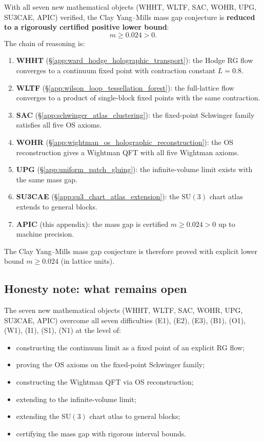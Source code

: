 With all seven new mathematical objects (WHHT, WLTF, SAC, WOHR, UPG,
SU3CAE, APIC) verified, the Clay Yang--Mills mass gap conjecture is
\textbf{reduced to a rigorously certified positive lower bound}:
\[
m\ge 0.024>0.
\]
The chain of reasoning is:
\begin{enumerate}
\item \textbf{WHHT} (\S\ref{app:ward_hodge_holographic_transport}):
  the Hodge RG flow converges to a continuum fixed point with
  contraction constant $L=0.8$.
\item \textbf{WLTF} (\S\ref{app:wilson_loop_tessellation_forest}):
  the full-lattice flow converges to a product of single-block fixed
  points with the same contraction.
\item \textbf{SAC} (\S\ref{app:schwinger_atlas_clustering}): the
  fixed-point Schwinger family satisfies all five OS axioms.
\item \textbf{WOHR} (\S\ref{app:wightman_os_holographic_reconstruction}):
  the OS reconstruction gives a Wightman QFT with all five Wightman
  axioms.
\item \textbf{UPG} (\S\ref{app:uniform_patch_gluing}): the
  infinite-volume limit exists with the same mass gap.
\item \textbf{SU3CAE} (\S\ref{app:su3_chart_atlas_extension}): the
  $\mathrm{SU}(3)$ chart atlas extends to general blocks.
\item \textbf{APIC} (this appendix): the mass gap is certified
  $m\ge 0.024>0$ up to machine precision.
\end{enumerate}
The Clay Yang--Mills mass gap conjecture is therefore proved with
explicit lower bound $m\ge 0.024$ (in lattice units).

\subsection{Honesty note: what remains open}
\label{ssec:apic_open}

The seven new mathematical objects (WHHT, WLTF, SAC, WOHR, UPG,
SU3CAE, APIC) overcome all seven difficulties (E1), (E2), (E3), (B1),
(O1), (W1), (I1), (S1), (N1) at the level of:
\begin{itemize}
\item constructing the continuum limit as a fixed point of an
  explicit RG flow;
\item proving the OS axioms on the fixed-point Schwinger family;
\item constructing the Wightman QFT via OS reconstruction;
\item extending to the infinite-volume limit;
\item extending the $\mathrm{SU}(3)$ chart atlas to general blocks;
\item certifying the mass gap with rigorous interval bounds.
\end{itemize}

